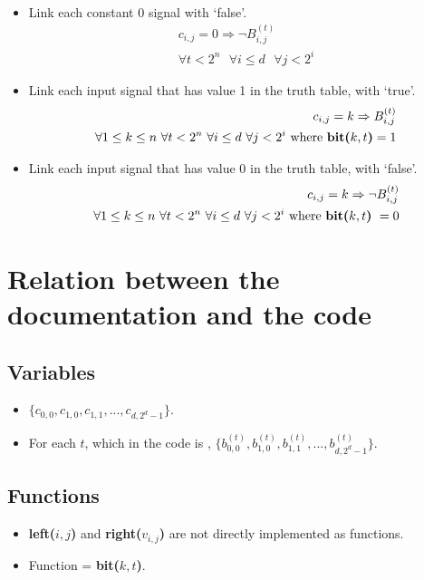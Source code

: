 \documentclass[letterpaper,10pt]{article}
\begin{document}
\begin{itemize}
\begin{align*}
    \end{align*}
    \item Link each constant 0 signal with `false'.
    \begin{align*}
        c_{i,j} = 0 \Rightarrow \lnot B_{i,j}^{(t)} \\
        \forall t < 2^n\text{ }\forall i \leq d\text{ }\forall j < 2^i
    \end{align*}
    \item Link each input signal that has value 1 in the truth table, with `true'.
    \begin{align*}
        c_{i,j} = k \Rightarrow B_{i,j}^{(t)} \\
        \forall 1 \leq k \leq n\text{ }\forall t  < 2^n\text{ }\forall i \leq d\text{ }\forall j < 2^i\text{ where \textbf{bit($k,t$)}} = 1
    \end{align*}
    \item Link each input signal that has value 0 in the truth table, with `false'.
    \begin{align*}
        c_{i,j} = k \Rightarrow \lnot B_{i,j}^{(t)} \\
        \forall 1 \leq k \leq n\text{ }\forall t < 2^n\text{ }\forall i \leq d\text{ }\forall j < 2^i\text{ where \textbf{bit($k,t$)} }= 0
    \end{align*}
\end{itemize}

\section{Relation between the documentation and the code}
\subsection{Variables}
\begin{itemize}
    \item {}$\{c_{0,0},c_{1,0},c_{1,1},...,c_{d,2^d-1}\}$.
    \item For each $t$, which in the code is , $\{b_{0,0}^{(t)},b_{1,0}^{(t)},b_{1,1}^{(t)},...,b_{d,2^d-1}^{(t)}\}$.
\end{itemize}
\subsection{Functions}
\begin{itemize}
    \item \textbf{left{($i,j$)}} and \textbf{right($v_{i,j}$)} are not directly implemented as functions.
    \item Function  = \textbf{bit($k,t$)}.
\end{itemize}
\end{document}
